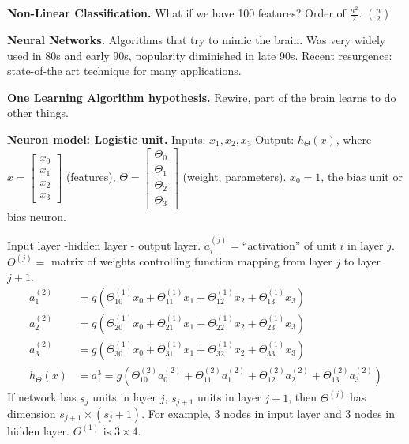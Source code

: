 \documentclass[a4 paper, 11 pt]{article}
\begin{document}
\textbf{Non-Linear Classification.} What if we have 100 features? Order of $\frac{n^2}{2}$. $\binom{n}{2}$

\textbf{Neural Networks.} Algorithms that try to mimic the brain. Was very widely used in 80s and early 90s, popularity diminished in late 90s. Recent resurgence: state-of-the art technique for many applications.

\textbf{One Learning Algorithm hypothesis.} Rewire, part of the brain learns to do other things.

\textbf{Neuron model: Logistic unit.} Inputs: $x_1, x_2, x_3$ Output: $h_\Theta(x)$, where $x = \begin{bmatrix} x_0 \\ x_1 \\ x_2 \\ x_3 \end{bmatrix}$ (features), $\Theta = \begin{bmatrix} \Theta_0 \\ \Theta_1 \\ \Theta_2 \\ \Theta_3 \end{bmatrix}$ (weight, parameters). $x_0 = 1$, the bias unit or bias neuron.

Input layer -hidden layer - output layer.
$a_i^{(j)} = $``activation'' of unit $i$ in layer $j$. $\Theta^{(j)} =$ matrix of weights controlling function mapping from layer $j$ to layer $j+1$.
\begin{align*}
a_1^{(2)} &= g(\Theta_{10}^{(1)}x_0 +\Theta_{11}^{(1)}x_1 + \Theta_{12}^{(1)}x_2 + \Theta_{13}^{(1)}x_3) \\
a_2^{(2)} &= g(\Theta_{20}^{(1)}x_0 +\Theta_{21}^{(1)}x_1 + \Theta_{22}^{(1)}x_2 + \Theta_{23}^{(1)}x_3) \\
a_3^{(2)} &= g(\Theta_{30}^{(1)}x_0 +\Theta_{31}^{(1)}x_1 + \Theta_{32}^{(1)}x_2 + \Theta_{33}^{(1)}x_3) \\
h_\Theta(x) &= a_1^{3} = g(\Theta_{10}^{(2)}a_0^{(2)} + \Theta_{11}^{(2)}a_1^{(2)} + \Theta_{12}^{(2)}a_2^{(2)} + \Theta_{13}^{(2)}a_3^{(2)})
\end{align*}
If network has $s_j$ units in layer $j$, $s_{j+1}$ units in layer $j+1$, then $\Theta^{(j)}$ has dimension $s_{j+1} \times (s_j + 1)$. For example, 3 nodes in input layer and 3 nodes in hidden layer. $\Theta^{(1)}$ is $3 \times 4$.
\end{document}
